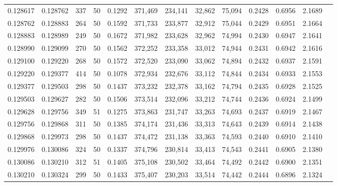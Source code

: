 \begin{tabular}{rrrrrrrrrrrrr}
0.128617 & 0.128762 &   337 &  50 &                                     0.1292 & 371,469 & 234,141 &  32,862 &  75,094 & 0.2428 & 0.6956 & 2.1689 \\
0.128762 & 0.128883 &   264 &  50 &                                     0.1592 & 371,733 & 233,877 &  32,912 &  75,044 & 0.2429 & 0.6951 & 2.1664 \\
0.128883 & 0.128989 &   249 &  50 &                                     0.1672 & 371,982 & 233,628 &  32,962 &  74,994 & 0.2430 & 0.6947 & 2.1641 \\
0.128990 & 0.129099 &   270 &  50 &                                     0.1562 & 372,252 & 233,358 &  33,012 &  74,944 & 0.2431 & 0.6942 & 2.1616 \\
0.129100 & 0.129220 &   268 &  50 &                                     0.1572 & 372,520 & 233,090 &  33,062 &  74,894 & 0.2432 & 0.6937 & 2.1591 \\
0.129220 & 0.129377 &   414 &  50 &                                     0.1078 & 372,934 & 232,676 &  33,112 &  74,844 & 0.2434 & 0.6933 & 2.1553 \\
0.129377 & 0.129503 &   298 &  50 &                                     0.1437 & 373,232 & 232,378 &  33,162 &  74,794 & 0.2435 & 0.6928 & 2.1525 \\
0.129503 & 0.129627 &   282 &  50 &                                     0.1506 & 373,514 & 232,096 &  33,212 &  74,744 & 0.2436 & 0.6924 & 2.1499 \\
0.129628 & 0.129756 &   349 &  51 &                                     0.1275 & 373,863 & 231,747 &  33,263 &  74,693 & 0.2437 & 0.6919 & 2.1467 \\
0.129756 & 0.129868 &   311 &  50 &                                     0.1385 & 374,174 & 231,436 &  33,313 &  74,643 & 0.2439 & 0.6914 & 2.1438 \\
0.129868 & 0.129973 &   298 &  50 &                                     0.1437 & 374,472 & 231,138 &  33,363 &  74,593 & 0.2440 & 0.6910 & 2.1410 \\
0.129976 & 0.130086 &   324 &  50 &                                     0.1337 & 374,796 & 230,814 &  33,413 &  74,543 & 0.2441 & 0.6905 & 2.1380 \\
0.130086 & 0.130210 &   312 &  51 &                                     0.1405 & 375,108 & 230,502 &  33,464 &  74,492 & 0.2442 & 0.6900 & 2.1351 \\
0.130210 & 0.130324 &   299 &  50 &                                     0.1433 & 375,407 & 230,203 &  33,514 &  74,442 & 0.2444 & 0.6896 & 2.1324 \\

\end{tabular}
